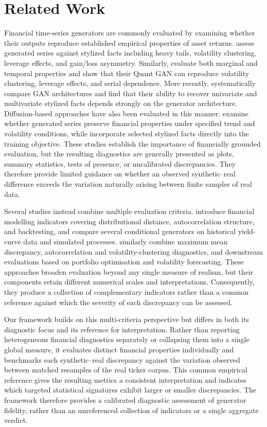 \section{Related Work}\label{sec:related_work}

Financial time-series generators are commonly evaluated by examining whether their outputs reproduce established empirical properties of asset returns.
\citet{takahashi2019modeling} assess generated series against stylized facts including heavy tails, volatility clustering, leverage effects, and gain/loss asymmetry.
Similarly, \citet{wiese2020quant} evaluate both marginal and temporal properties and show that their Quant GAN can reproduce volatility clustering, leverage effects, and serial dependence.
More recently, \citet{kwon2024stylized} systematically compare GAN architectures and find that their ability to recover univariate and multivariate stylized facts depends strongly on the generator architecture.
Diffusion-based approaches have also been evaluated in this manner: \citet{tanaka2025cofindiff} examine whether generated series preserve financial properties under specified trend and volatility conditions, while \citet{zhang2026sfag} incorporate selected stylized facts directly into the training objective.
These studies establish the importance of financially grounded evaluation, but the resulting diagnostics are generally presented as plots, summary statistics, tests of presence, or uncalibrated discrepancies.
They therefore provide limited guidance on whether an observed synthetic--real difference exceeds the variation naturally arising between finite samples of real data.

Several studies instead combine multiple evaluation criteria.
\citet{ericson2024deep} introduce financial modelling indicators covering distributional distance, autocorrelation structure, and backtesting, and compare several conditional generators on historical yield-curve data and simulated processes.
\citet{hounwanou2025evaluating} similarly combine maximum mean discrepancy, autocorrelation and volatility-clustering diagnostics, and downstream evaluations based on portfolio optimisation and volatility forecasting.
These approaches broaden evaluation beyond any single measure of realism, but their components retain different numerical scales and interpretations.
Consequently, they produce a collection of complementary indicators rather than a common reference against which the severity of each discrepancy can be assessed.

Our framework builds on this multi-criteria perspective but differs in both its diagnostic focus and its reference for interpretation.
Rather than reporting heterogeneous financial diagnostics separately or
collapsing them into a single global measure, it evaluates distinct financial
properties individually and benchmarks each synthetic--real discrepancy
against the variation observed between matched resamples of the real ticker
corpus.
This common empirical reference gives the resulting metrics a consistent
interpretation and indicates which targeted statistical signatures exhibit
larger or smaller discrepancies.
The framework therefore provides a calibrated diagnostic assessment of generator fidelity, rather than an unreferenced collection of indicators or a single aggregate verdict.
